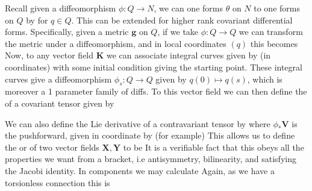 \documentclass{article}
\begin{document}
Recall given a diffeomorphism $\phi:Q \to N$, we can  one forms $\theta$ on $N$ to one forms on $Q$ by 
for $q \in Q$. This can be extended for higher rank covariant differential forms. Specifically, given a metric $\bm{g}$ on $Q$, if we take $\phi:Q \to Q$ we can transform the metric under a diffeomorphism, and in local coordinates $(q)$ this becomes 
Now, to any vector field $\bm{K}$ we can associate integral curves given by (in coordinates)
with some initial condition giving the starting point. These integral curves give a diffeomorphism $\phi_s : Q \to Q$ given by $q(0) \mapsto q(s)$, which is moreover a 1 parameter family of diffs. To this vector field we can then define the  of a covariant tensor given by 
\begin{prop}
\end{prop}
\begin{prop}
\end{prop}
We can also define the Lie derivative of a contravariant tensor by 
where $\phi_\ast \bm{V}$ is the pushforward, given in coordinate by (for example)
This allows us to define the  or  of two vector fields $\bm{X},\bm{Y}$ to be 
It is a verifiable fact that this obeys all the properties we want from a bracket, i.e antisymmetry, bilinearity, and satisfying the Jacobi identity. In components we may calculate 
Again, as we have a torsionless connection this is 
\end{document}
